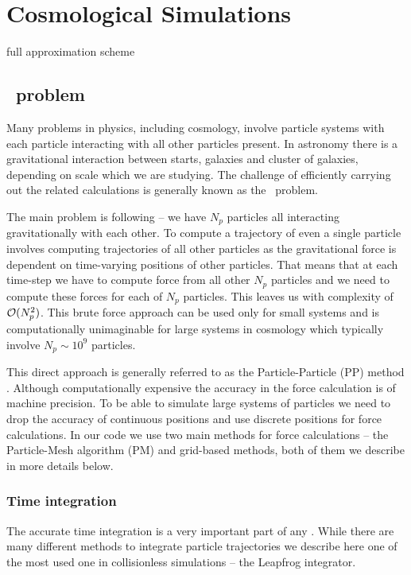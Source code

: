 \chapter{Cosmological Simulations}

full approximation scheme \parencite[FAS, see, e.g.,][]{MG_overview}


\section{\nbody\ problem}
Many problems in physics, including cosmology, involve particle systems with each particle interacting with all other particles present. In astronomy there is a gravitational interaction between starts, galaxies and cluster of galaxies, depending on scale which we are studying. The challenge of efficiently carrying out the related calculations is generally known as the \nbody\ problem.

The main problem is following -- we have $N_p$ particles all interacting gravitationally with each other. To compute a trajectory of even a single particle involves computing trajectories of all other particles as the gravitational force is dependent on time-varying positions of other particles. That means that at each time-step we have to compute force from all other $N_p$ particles and we need to compute these forces for each of $N_p$ particles. This leaves us with complexity of \(\mathcal{O}(N_p^2)\). This brute force approach can be used only for small systems and is computationally unimaginable for large systems in cosmology which typically involve \(N_p\sim10^{9}\) particles.

This direct approach is generally referred to as the Particle-Particle (PP) method \parencite{Hockney:1988:CSU:62815}. Although computationally expensive the accuracy in the force calculation is of machine precision. To be able to simulate large systems of particles we need to drop the accuracy of continuous positions and use discrete positions for force calculations. In our code we use two main methods for force calculations -- the Particle-Mesh algorithm (PM) and grid-based methods, both of them we describe in more details below.
\subsection{Time integration}
The accurate time integration is a very important part of any \nbodysim. While there are many different methods to integrate particle trajectories \parencite[see e.g.][]{Hockney:1988:CSU:62815} we describe here one of the most used one in collisionless simulations -- the Leapfrog integrator.


